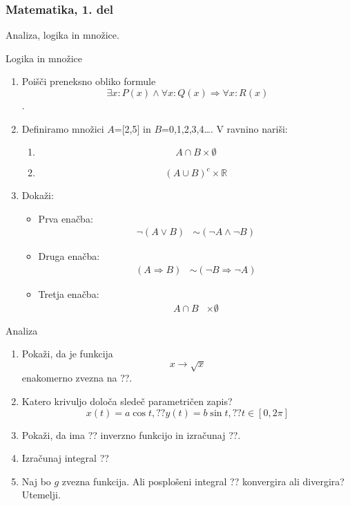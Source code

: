 
\begin{frame}
	\frametitle{Matematika, 1. del}
 Analiza, logika in množice.
	
  \end{frame}

\begin{frame}{Logika in množice}
	\begin{enumerate}
		\item
		Poišči preneksno obliko formule \[
\exists x : P(x) \land \forall x : Q(x) \Rightarrow \forall x : R(x)
\].
		\item 
		Definiramo množici $A$=[2,5] in $B$={0,1,2,3,4\dots}.
		V ravnino nariši:
		\begin{enumerate}
		   \item \[ \displaystyle
A \cap B \times \emptyset
\]
		   \item \[ \displaystyle
(A \cup B)^c \times \mathbb{R}
\]
		\end{enumerate}
		\item
		Dokaži:
		\begin{itemize}
			\item Prva enačba:
			\begin{align*}
				\neg (A \lor B) &\sim (\neg A \land \neg B)
			\end{align*}
			\item Druga enačba:
			\begin{align*}
				(A \Rightarrow B) &\sim (\neg B \Rightarrow \neg A)
			\end{align*}
			\item Tretja enačba:
			\begin{align*}
				A \cap B &\times \emptyset
			\end{align*}
	    \end{itemize}
	\end{enumerate}
\end{frame}

\begin{frame}{Analiza}
	\begin{enumerate}
		\item
		Pokaži, da je funkcija \[ x\to\sqrt{x} \] enakomerno zvezna na ??.
		\item 
		Katero krivuljo določa sledeč parametričen zapis?
		$$
		   x(t) = a \cos t, ?? %
		   y(t) = b \sin t, ?? %
		   t \in [0, 2 \pi]
		$$ 
		\item
		Pokaži, da ima ?? inverzno funkcijo in izračunaj ??.
		
		\item
		Izračunaj integral 
		??
		\item 
		Naj bo $g$ zvezna funkcija. Ali posplošeni integral 
		??
		konvergira ali divergira? Utemelji.
	\end{enumerate}
\end{frame}

